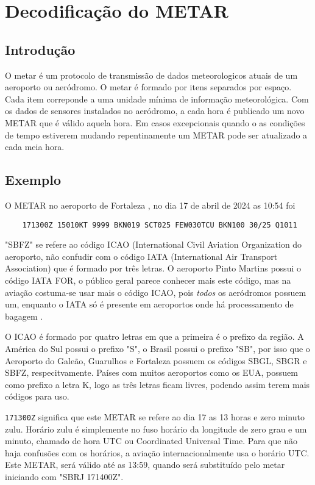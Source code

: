 \chapter{Decodificação do METAR}

\section{Introdução}
O metar é um protocolo de transmissão de dados meteorologicos atuais de um aeroporto ou aeródromo.
O metar é formado por itens separados por espaço. Cada item correponde a uma
unidade mínima de informação meteorológica. Com os dados de sensores instalados no aeródromo, a
cada hora é publicado um novo METAR que é válido aquela hora. Em casos excepcionais quando o as condições de tempo 
estiverem mudando repentinamente um METAR pode ser atualizado a cada meia hora. \cite{metar-speci}

\section{Exemplo}
O METAR no aeroporto de Fortaleza \cite{metar-sbfz}, no dia 17 de abril de 2024 as 10:54 foi
\begin{verbatim}
    171300Z 15010KT 9999 BKN019 SCT025 FEW030TCU BKN100 30/25 Q1011
\end{verbatim}

"SBFZ" se refere ao código ICAO (International Civil Aviation Organization  do aeroporto, não
confudir com o código IATA (International Air Transport Association) que é formado por três letras.
O aeroporto Pinto Martins possui o código IATA FOR, o público geral parece conhecer mais este código, mas na aviação
costuma-se usar mais o código ICAO, pois \textit{todos} os aeródromos possuem um, enquanto o IATA só 
é presente em aeroportos onde há processamento de bagagem \cite{iata-codes} \cite{icao-codes}. 

O ICAO é formado por quatro letras em que a primeira é o prefixo da região.
A América do Sul possui o prefixo "S",
o Brasil possui o prefixo "SB", por isso que o Aeroporto do Galeão, Guarulhos e Fortaleza possuem 
os códigos SBGL, SBGR e SBFZ, respecitvamente. Países com muitos aeroportos como os EUA, possuem
como prefixo a letra K, logo as três letras ficam livres, podendo assim terem mais códigos para uso.

\texttt{171300Z} significa que este METAR se refere ao dia 17 as 13 horas e zero minuto zulu. Horário
zulu é simplemente no fuso horário da longitude de zero grau e um minuto, chamado de hora UTC ou 
Coordinated Universal Time. \cite{UTC} Para que não haja confusões com os horários, a aviação internacionalmente
usa o horário UTC. Este METAR, será válido até as 13:59,
quando será substituído pelo metar iniciando com "SBRJ 171400Z".

